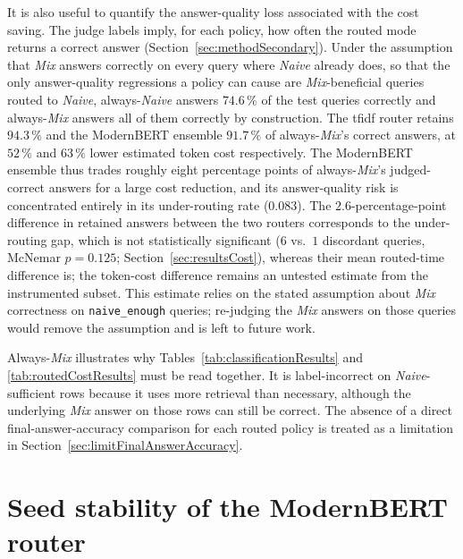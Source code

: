 \documentclass[english, bibtex]{kththesis}               %
\numberwithin{listing}{chapter}
\begin{document}
It is also useful to quantify the answer-quality loss associated with the cost saving. The judge labels imply, for each policy, how often the routed mode returns a correct answer (Section~\ref{sec:methodSecondary}). Under the assumption that \emph{Mix} answers correctly on every query where \emph{Naive} already does, so that the only answer-quality regressions a policy can cause are \emph{Mix}-beneficial queries routed to \emph{Naive}, always-\emph{Naive} answers $74.6\,\%$ of the test queries correctly and always-\emph{Mix} answers all of them correctly by construction. The \gls{tfidf} router retains $94.3\,\%$ and the ModernBERT ensemble $91.7\,\%$ of always-\emph{Mix}'s correct answers, at $52\,\%$ and $63\,\%$ lower estimated token cost respectively. The ModernBERT ensemble thus trades roughly eight percentage points of always-\emph{Mix}'s judged-correct answers for a large cost reduction, and its answer-quality risk is concentrated entirely in its under-routing rate ($0.083$). The $2.6$-percentage-point difference in retained answers between the two routers corresponds to the under-routing gap, which is not statistically significant ($6$ vs.\ $1$ discordant queries, McNemar $p = 0.125$; Section~\ref{sec:resultsCost}), whereas their mean routed-time difference is; the token-cost difference remains an untested estimate from the instrumented subset. This estimate relies on the stated assumption about \emph{Mix} correctness on \texttt{naive\_enough} queries; re-judging the \emph{Mix} answers on those queries would remove the assumption and is left to future work.

Always-\emph{Mix} illustrates why Tables~\ref{tab:classificationResults} and \ref{tab:routedCostResults} must be read together. It is label-incorrect on \emph{Naive}-sufficient rows because it uses more retrieval than necessary, although the underlying \emph{Mix} answer on those rows can still be correct. The absence of a direct final-answer-accuracy comparison for each routed policy is treated as a limitation in Section~\ref{sec:limitFinalAnswerAccuracy}.

\section{Seed stability of the ModernBERT router}
\label{sec:resultsSeeds}
\end{document}
